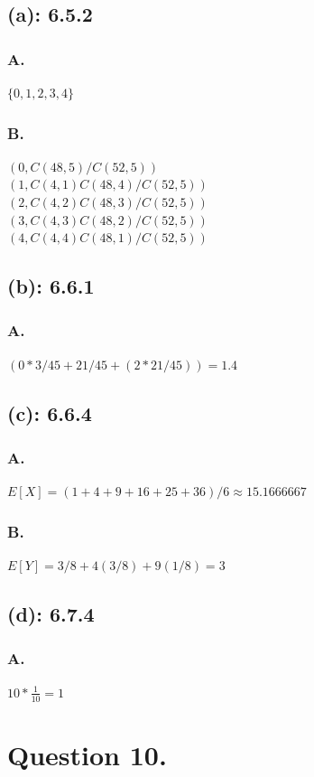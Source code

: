 \documentclass[titlepage]{article}\pagestyle{empty}
\begin{document}
\subsection*{(a): 6.5.2}
\subsubsection*{A.} $\{ 0, 1, 2, 3, 4 \}$
\subsubsection*{B.} 
$(0, C(48,5)/C(52,5))$\\
$(1, C(4,1) C(48,4)/C(52,5))$\\
$(2, C(4,2) C(48,3)/C(52,5))$\\
$(3, C(4,3) C(48,2)/C(52,5))$\\
$(4, C(4,4) C(48,1)/C(52,5))$
\subsection*{(b): 6.6.1}
\subsubsection*{A.} $(0 * 3/45 + 21/45 + (2 * 21/45)) = 1.4$

\subsection*{(c): 6.6.4}
\subsubsection*{A.} $E[X] = (1+4+9+16+25+36)/6 \approx 15.1666667$
\subsubsection*{B.} $E[Y] = 3/8 + 4(3/8) + 9(1/8) = 3$

\subsection*{(d): 6.7.4}
\subsubsection*{A.} $10 * \frac{1}{10} = 1$

\pagebreak
\section*{Question 10.}
\end{document}
